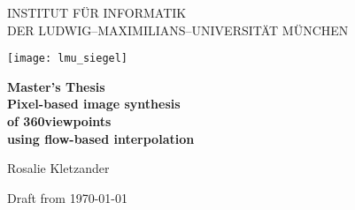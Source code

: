\let\textacute\'

\thispagestyle{empty}

\begin{center}

\vspace*{-2cm}

{\Huge INSTITUT FÜR INFORMATIK\\[1mm]}
DER LUDWIG--MAXIMILIANS--UNIVERSITÄT MÜNCHEN\\

\vspace*{1cm}

\texttt{[image: lmu\_siegel]}

\vspace*{2cm}

{\Large \textbf{Master's Thesis}}\\ %

\vspace{2.0cm}
{\Huge \textbf{Pixel-based image synthesis}}\\
\vspace*{3mm}
{\Huge \textbf{of 360\degree viewpoints}}\\
\vspace*{3mm}
{\Huge \textbf{using flow-based interpolation}}\\
\vspace{1.5cm}

{\LARGE Rosalie Kletzander} %

\vspace{3cm}
Draft from \today %

\end{center}

\newpage


\thispagestyle{empty}
\cleardoublepage


\thispagestyle{empty}

